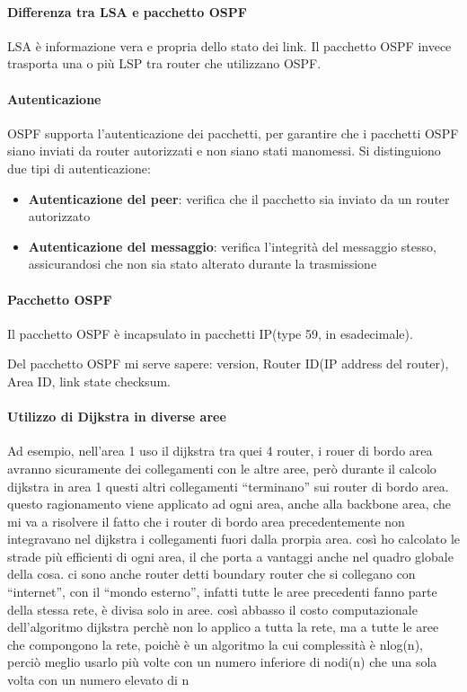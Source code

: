 \newpage
\paragraph{Differenza tra LSA e pacchetto OSPF}
LSA è informazione vera e propria dello stato dei link.
Il pacchetto OSPF invece trasporta una o più LSP tra router che utilizzano OSPF.
\paragraph{Autenticazione}
OSPF supporta l'autenticazione dei pacchetti, per garantire che i pacchetti OSPF siano inviati da router autorizzati e non siano stati manomessi.
Si distinguiono due tipi di autenticazione:
\begin{itemize}
    \item \textbf{Autenticazione del peer}: verifica che il pacchetto sia inviato da un router autorizzato
    \item \textbf{Autenticazione del messaggio}: verifica l'integrità del messaggio stesso, assicurandosi che non sia stato alterato durante la trasmissione
\end{itemize}
\paragraph{Pacchetto OSPF}
Il pacchetto OSPF è incapsulato in pacchetti IP(type 59, in esadecimale).

Del pacchetto OSPF mi serve sapere: version, Router ID(IP address del router), Area ID, link state checksum.


\paragraph{Utilizzo di Dijkstra in diverse aree}
Ad esempio, nell'area 1 uso il dijkstra tra quei 4 router, i rouer di bordo area avranno sicuramente dei collegamenti con le altre aree, però durante il calcolo dijkstra in area 1 questi altri collegamenti “terminano” sui router di bordo area. 
questo ragionamento viene applicato ad ogni area, anche alla backbone area, che mi va a risolvere il fatto che i router di bordo area precedentemente non integravano nel dijkstra i collegamenti fuori dalla prorpia area. così ho calcolato le strade più efficienti di ogni area, il che porta a vantaggi anche nel quadro globale della cosa.
ci sono anche router detti boundary router che si collegano con “internet”, con il “mondo esterno”, infatti tutte le aree precedenti fanno parte della stessa rete, è divisa solo in aree.
così abbasso il costo computazionale dell'algoritmo dijkstra perchè non lo applico a tutta la rete, ma a tutte le aree che compongono la rete, poichè è un algoritmo la cui complessità è nlog(n), perciò meglio usarlo più volte con un numero inferiore di nodi(n) che una sola volta con un numero  elevato di n

